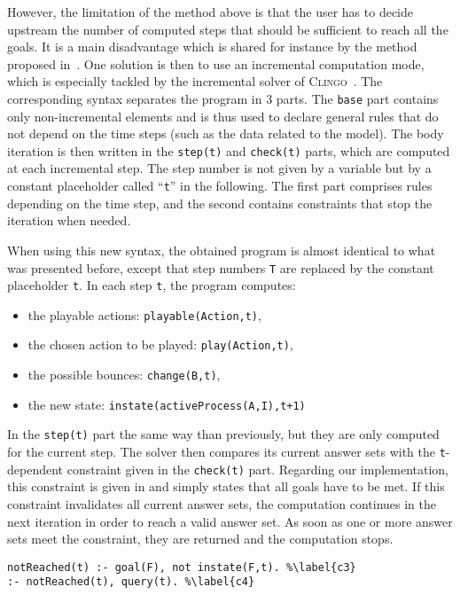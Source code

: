 However, the limitation of the method above is that the user has to decide upstream
the number of computed steps that should be sufficient to reach all the goals.
It is a main disadvantage which is shared for instance by the method proposed in~\cite{roccaasp}. %
One solution is then to use an incremental computation mode,
which is especially tackled by the incremental solver of \textsc{Clingo}~\cite{gebser2010incremental}.
The corresponding syntax separates the program in 3 parts.
The \texttt{base} part contains only non-incremental elements
and is thus used to declare general rules
that do not depend on the time steps (such as the data related to the model).
The body iteration is then written in the
\texttt{step(t)} and \texttt{check(t)} parts,
which are computed at each incremental step. The step number is not given by a variable but by a constant placeholder called ``\texttt{t}'' in the following.
The first part comprises rules depending on the time step,
and the second contains constraints that stop the iteration when needed.

When using this new syntax, the obtained program is almost identical
to what was presented before,
except that step numbers \texttt{T}
are replaced by the constant placeholder \texttt{t}.
In each step \texttt{t}, the program computes:
\begin{itemize}\renewcommand{\labelitemi}{--}
  \item the playable actions: \texttt{playable(Action,t)},
  \item the chosen action to be played: \texttt{play(Action,t)},
  \item the possible bounces: \texttt{change(B,t)},
  \item the new state: \texttt{instate(activeProcess(A,I),t+1)}
\end{itemize}
In the \texttt{step(t)} part
the same way than previously,
but they are only computed for the current step.
The solver then compares its current answer sets with
the \texttt{t}-dependent constraint given in the \texttt{check(t)} part.
Regarding our implementation, this constraint is given in 
and simply states that all goals have to be met.
If this constraint invalidates all current answer sets,
the computation continues in the next iteration in order to reach a valid answer set.
As soon as one or more answer sets meet the constraint,
they are returned and the computation stops.
\begin{lstlisting}
notReached(t) :- goal(F), not instate(F,t). %\label{c3}
:- notReached(t), query(t). %\label{c4}
\end{lstlisting}


